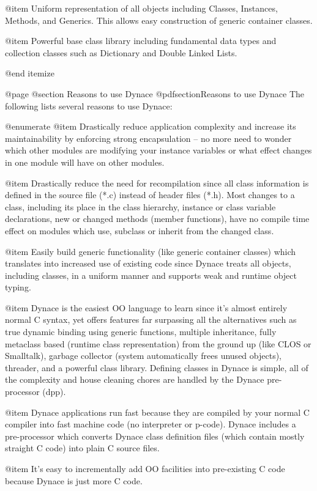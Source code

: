 @item Uniform representation of all objects including Classes, Instances,
Methods, and Generics.  This allows easy construction of generic container
classes.

@item Powerful base class library including fundamental data types and
collection classes such as Dictionary and Double Linked Lists.

@end itemize


@page
@section Reasons to use Dynace
@pdfsection{Reasons to use Dynace}
The following lists several reasons to use Dynace:

@enumerate
@item
Drastically reduce application complexity and increase its
maintainability by enforcing strong encapsulation -- no more need to
wonder which other modules are modifying your instance variables or
what effect changes in one module will have on other modules.

@item
Drastically reduce the need for recompilation since all class information
is defined in the source file (*.c) instead of header files (*.h).  Most
changes to a class, including its place in the class hierarchy, instance
or class variable declarations, new or changed methods (member functions),
have no compile time effect on modules which use, subclass or inherit 
from the changed class.

@item
Easily build generic functionality (like generic container classes)
which translates into increased use of existing code since Dynace
treats all objects, including classes, in a uniform manner and supports
weak and runtime object typing.

@item
Dynace is the easiest OO language to learn since it's almost entirely
normal C syntax, yet offers features far surpassing all the alternatives
such as true dynamic binding using generic functions, multiple inheritance,
fully metaclass based (runtime class representation) from the ground up
(like CLOS or Smalltalk), garbage collector (system automatically frees
unused objects), threader, and a powerful class library.  Defining classes
in Dynace is simple, all of the complexity and house cleaning chores are
handled by the Dynace pre-processor (dpp).

@item
Dynace applications run fast because they are compiled by your normal
C compiler into fast machine code (no interpreter or p-code).  Dynace
includes a pre-processor which converts Dynace class definition files
(which contain mostly straight C code) into plain C source files.

@item
It's easy to incrementally add OO facilities into pre-existing C code
because Dynace is just more C code.


